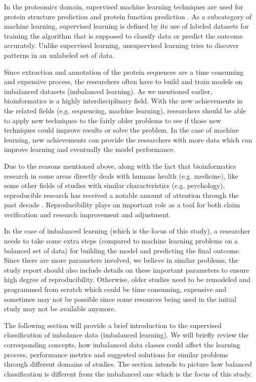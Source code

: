 In the proteomics domain, supervised machine learning techniques are used for protein structure prediction and protein 
function prediction \cite{lesh_complete_2003,mishra_prediction_2014}. As a subcategory of machine learning, supervised 
learning is defined by its use of labeled datasets for training the algorithm that is supposed to classify data or 
predict the outcome accurately. Unlike supervised learning, unsupervised learning tries to discover patterns in an unlabeled 
set of data.

Since extraction and annotation of the protein sequences are a time consuming and expensive process, the researchers 
often have to build and train models on imbalanced datasets (imbalanced learning). As we mentioned earlier, bioinformatics 
is a highly interdisciplinary field. With the new achievements in the related fields (e.g. sequencing, machine learning), 
researchers should be able to apply new techniques to the fairly older problems to see if those new techniques could improve 
results or solve the problem. In the case of machine learning, new achievements can provide the researchers with more data 
which can improve learning and eventually the model performance.

Due to the reasons mentioned above, along with the fact that bioinformatics research in some areas directly deals 
with humans health (e.g. medicine), like some other fields of studies with similar characteristics (e.g. psychology), 
reproducible research has received a notable amount of attention through the past decade 
\cite{tatman_practical_2018,mcdermott_reproducibility_2019}. Reproducibility plays an important role as a 
tool for both claim verification and research improvement and adjustment. 

In the case of imbalanced learning (which is the focus of this study), a researcher needs to take some extra steps 
(compared to machine learning problems on a balanced set of data) for building the model and predicting the final outcome. 
Since there are more parameters involved, we believe in similar problems, the study report should also include details on 
these important parameters to ensure high degree of reproducibility. Otherwise, older studies need to be remodeled and 
programmed from scratch which could be time consuming, expensive and sometimes may not be possible since some resources 
being used in the initial study may not be available anymore.

The following section will provide a brief introduction to the supervised classification of imbalance data 
(imbalanced learning). We will briefly review the corresponding concepts, how imbalanced data classes could affect the 
learning process, performance metrics and suggested solutions for similar problems through different domains of studies. 
The section intends to picture how balanced classification is different from the imbalanced one which is the focus of this study.
